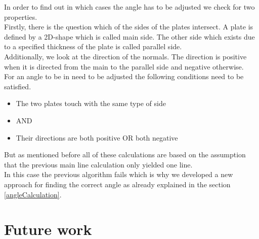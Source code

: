 \documentclass[../ClassicThesis.tex]{subfiles}
\begin{document}
In order to find out in which cases the angle has to be adjusted we check for two properties.\\
Firstly, there is the question which of the sides of the plates intersect. A plate is defined by a 2D-shape which is called main side. The other side which exists due to a specified thickness of the plate is called parallel side.\\
Additionally, we look at the direction of the normals. The direction is positive when it is directed from the main to the parallel side and negative otherwise.\\
For an angle to be in need to be adjusted the following conditions need to be satisfied.
\begin{itemize}
    \item The two plates touch with the same type of side 
    \item[] AND
    \item Their directions are both positive OR both negative
\end{itemize}
But as mentioned before all of these calculations are based on the assumption that the previous main line calculation only yielded one line.\\
In this case the previous algorithm fails which is why we developed a new approach for finding the correct angle as already explained in the section \ref{angleCalculation}.

\section{Future work}
\end{document}

